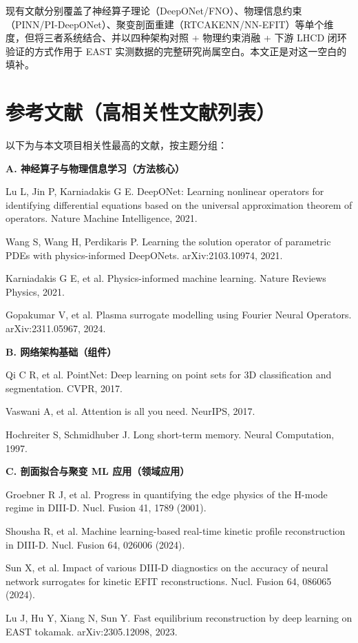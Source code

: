\documentclass[12pt,a4paper]{article}
\begin{document}
现有文献分别覆盖了神经算子理论（DeepONet/FNO）、物理信息约束（PINN/PI-DeepONet）、聚变剖面重建（RTCAKENN/NN-EFIT）等单个维度，但将三者系统结合、并以四种架构对照 + 物理约束消融 + 下游 LHCD 闭环验证的方式作用于 EAST 实测数据的完整研究尚属空白。本文正是对这一空白的填补。

\section*{参考文献（高相关性文献列表）}

以下为与本文项目相关性最高的文献，按主题分组：

\noindent\textbf{A. 神经算子与物理信息学习（方法核心）}
\begin{enumerate}[label={[\arabic*]}]
    \item Lu L, Jin P, Karniadakis G E. DeepONet: Learning nonlinear operators for identifying differential equations based on the universal approximation theorem of operators. Nature Machine Intelligence, 2021.
    \item Wang S, Wang H, Perdikaris P. Learning the solution operator of parametric PDEs with physics-informed DeepONets. arXiv:2103.10974, 2021.
    \item Karniadakis G E, et al. Physics-informed machine learning. Nature Reviews Physics, 2021.
    \item Gopakumar V, et al. Plasma surrogate modelling using Fourier Neural Operators. arXiv:2311.05967, 2024.
\end{enumerate}

\noindent\textbf{B. 网络架构基础（组件）}
\begin{enumerate}[label={[\arabic*]}]
    \item Qi C R, et al. PointNet: Deep learning on point sets for 3D classification and segmentation. CVPR, 2017.
    \item Vaswani A, et al. Attention is all you need. NeurIPS, 2017.
    \item Hochreiter S, Schmidhuber J. Long short-term memory. Neural Computation, 1997.
\end{enumerate}

\noindent\textbf{C. 剖面拟合与聚变 ML 应用（领域应用）}
\begin{enumerate}[label={[\arabic*]}]
    \item Groebner R J, et al. Progress in quantifying the edge physics of the H-mode regime in DIII-D. Nucl. Fusion 41, 1789 (2001).
    \item Shousha R, et al. Machine learning-based real-time kinetic profile reconstruction in DIII-D. Nucl. Fusion 64, 026006 (2024).
    \item Sun X, et al. Impact of various DIII-D diagnostics on the accuracy of neural network surrogates for kinetic EFIT reconstructions. Nucl. Fusion 64, 086065 (2024).
    \item Lu J, Hu Y, Xiang N, Sun Y. Fast equilibrium reconstruction by deep learning on EAST tokamak. arXiv:2305.12098, 2023.
\end{enumerate}
\end{document}
